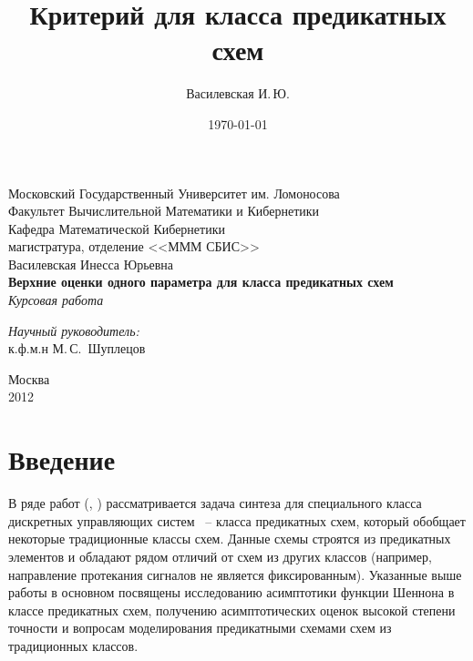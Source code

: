 \documentclass[12pt]{article}
\title{Критерий для класса предикатных схем}
\author{Василевская И.\,Ю.}
\date{\today}
\begin{document}
    \begin{titlepage}
        \begin{center}
            Московский Государственный Университет им. Ломоносова\\
            Факультет Вычислительной Математики и Кибернетики\\
            Кафедра Математической Кибернетики\\
            магистратура, отделение <<МММ СБИС>>\\[6cm]

            \large {Василевская Инесса Юрьевна}\\
            \LARGE \textbf {Верхние оценки одного параметра для класса предикатных схем}\\[0.8cm]
            \large \emph {Курсовая работа}\\[5.0cm]

            \begin{flushright}
                \large
                \begin{minipage}{0.40\textwidth}
                    \begin{flushleft}
                        \emph{Научный руководитель:}\\к.ф.м.н М.\,С.~Шуплецов
                    \end{flushleft}
                \end{minipage}
            \end{flushright}

            \vfill
            Москва\\
			2012
        \end{center}
    \end{titlepage}

\setcounter{page}{2}

\section{Введение}
\label{beginning}
В ряде работ (\cite{Shu09}, \cite{Shu11}) рассматривается задача синтеза для специального класса дискретных управляющих систем ~--
класса предикатных схем, который обобщает некоторые традиционные классы схем. Данные схемы строятся из предикатных элементов
и обладают рядом отличий от схем из других классов (например, направление протекания сигналов не является фиксированным).
Указанные выше работы в основном посвящены исследованию асимптотики функции Шеннона в классе предикатных схем,
 получению асимптотических оценок высокой степени точности и вопросам моделирования предикатными схемами схем из традиционных классов.
\end{document}
